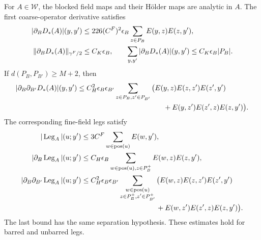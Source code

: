 \documentclass[11pt,letterpaper,reqno]{amsart}
\begin{document}
\begin{proposition}\label{prop:interacting-local-insertions}
For $A\in\mathcal W$, the blocked field maps and
their Hölder maps are analytic in $A$. The first
coarse-operator derivative satisfies
\begin{align}
 |\partial_BD_*(A)|(y,y')
  &\le226(C^F)^2\epsilon_B
       \sum_{z\in P_B}E(y,z)E(z,y'),\notag\\
 \|\partial_BD_*(A)\|_{\gamma^F/2}
  &\le C_K\epsilon_B,\qquad
 \sum_{y,y'}|\partial_BD_*(A)|(y,y')
                           \le C_K\epsilon_B|P_B|.
                                  \label{eq:interacting-coarse-first}
\end{align}
If $d(P_B,P_{B'})\ge M+2$, then
\begin{align}
 |\partial_B\partial_{B'}D_*(A)|(y,y')
 \le{}& C_H^2\epsilon_B\epsilon_{B'}
       \sum_{z\in P_B,z'\in P_{B'}}
       \big(E(y,z)E(z,z')E(z',y')\notag\\*
       &\hspace{38mm}+E(y,z')E(z',z)E(z,y')\big).
                                  \label{eq:interacting-coarse-mixed}
\end{align}
The corresponding fine-field legs satisfy
\begin{align}
 |\operatorname{Leg}_A|(u;y')
   &\le3C^F\sum_{w\in\operatorname{pos}(u)}E(w,y'),\notag\\
 |\partial_B\operatorname{Leg}_A|(u;y')
   &\le C_H\epsilon_B
       \sum_{w\in\operatorname{pos}(u),z\in P_B^+}E(w,z)E(z,y'),
                                  \label{eq:interacting-leg-first}\\
 |\partial_B\partial_{B'}\operatorname{Leg}_A|(u;y')
   &\le C_H^2\epsilon_B\epsilon_{B'}
       \sum_{\substack{w\in\operatorname{pos}(u)\\z\in P_B^+,z'\in P_{B'}^+}}
       \big(E(w,z)E(z,z')E(z',y')\notag\\
   &\hspace{37mm}+E(w,z')E(z',z)E(z,y')\big).
                                  \label{eq:interacting-leg-mixed}
\end{align}
The last bound has the same separation hypothesis.
These estimates hold for barred and unbarred legs.
\end{proposition}
\end{document}
